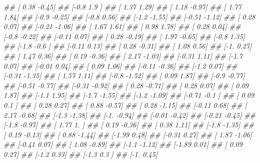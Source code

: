 \documentclass[
]{book}
\newenvironment{Shaded}{\begin{snugshade}}{\end{snugshade}}
\newcommand{\CommentTok}[1]{\textcolor[rgb]{0.56,0.35,0.01}{\textit{#1}}}
\theoremstyle{definition}
\theoremstyle{definition}
\theoremstyle{definition}
\theoremstyle{definition}
\theoremstyle{remark}
\begin{document}
\begin{Shaded}
\begin{Highlighting}[]
\CommentTok{\#\#  [ 0.38 {-}0.45]}
\CommentTok{\#\#  [{-}0.8   1.9 ]}
\CommentTok{\#\#  [ 1.37  1.29]}
\CommentTok{\#\#  [ 1.18 {-}0.97]}
\CommentTok{\#\#  [ 1.77  1.84]}
\CommentTok{\#\#  [{-}0.9  {-}0.25]}
\CommentTok{\#\#  [{-}0.8   0.56]}
\CommentTok{\#\#  [{-}1.2  {-}1.55]}
\CommentTok{\#\#  [{-}0.51 {-}1.12]}
\CommentTok{\#\#  [ 0.28  0.07]}
\CommentTok{\#\#  [{-}0.21 {-}1.06]}
\CommentTok{\#\#  [ 1.67  1.61]}
\CommentTok{\#\#  [ 0.98  1.78]}
\CommentTok{\#\#  [ 0.28  0.04]}
\CommentTok{\#\#  [{-}0.8  {-}0.22]}
\CommentTok{\#\#  [{-}0.11  0.07]}
\CommentTok{\#\#  [ 0.28 {-}0.19]}
\CommentTok{\#\#  [ 1.97 {-}0.65]}
\CommentTok{\#\#  [{-}0.8   1.35]}
\CommentTok{\#\#  [{-}1.8  {-}0.6 ]}
\CommentTok{\#\#  [{-}0.11  0.13]}
\CommentTok{\#\#  [ 0.28 {-}0.31]}
\CommentTok{\#\#  [ 1.08  0.56]}
\CommentTok{\#\#  [{-}1.    0.27]}
\CommentTok{\#\#  [ 1.47  0.36]}
\CommentTok{\#\#  [ 0.19 {-}0.36]}
\CommentTok{\#\#  [ 2.17 {-}1.03]}
\CommentTok{\#\#  [{-}0.31  1.11]}
\CommentTok{\#\#  [{-}1.7   0.07]}
\CommentTok{\#\#  [{-}0.01  0.04]}
\CommentTok{\#\#  [ 0.09  1.06]}
\CommentTok{\#\#  [{-}0.11 {-}0.36]}
\CommentTok{\#\#  [{-}1.2   0.07]}
\CommentTok{\#\#  [{-}0.31 {-}1.35]}
\CommentTok{\#\#  [ 1.57  1.11]}
\CommentTok{\#\#  [{-}0.8  {-}1.52]}
\CommentTok{\#\#  [ 0.09  1.87]}
\CommentTok{\#\#  [{-}0.9  {-}0.77]}
\CommentTok{\#\#  [{-}0.51 {-}0.77]}
\CommentTok{\#\#  [{-}0.31 {-}0.92]}
\CommentTok{\#\#  [ 0.28 {-}0.71]}
\CommentTok{\#\#  [ 0.28  0.07]}
\CommentTok{\#\#  [ 0.09  1.87]}
\CommentTok{\#\#  [{-}1.1   1.95]}
\CommentTok{\#\#  [{-}1.7  {-}1.55]}
\CommentTok{\#\#  [{-}1.2  {-}1.09]}
\CommentTok{\#\#  [{-}0.71 {-}0.1 ]}
\CommentTok{\#\#  [ 0.09  0.1 ]}
\CommentTok{\#\#  [ 0.28  0.27]}
\CommentTok{\#\#  [ 0.88 {-}0.57]}
\CommentTok{\#\#  [ 0.28 {-}1.15]}
\CommentTok{\#\#  [{-}0.11  0.68]}
\CommentTok{\#\#  [ 2.17 {-}0.68]}
\CommentTok{\#\#  [{-}1.3  {-}1.38]}
\CommentTok{\#\#  [{-}1.   {-}0.94]}
\CommentTok{\#\#  [{-}0.01 {-}0.42]}
\CommentTok{\#\#  [{-}0.21 {-}0.45]}
\CommentTok{\#\#  [{-}1.8  {-}0.97]}
\CommentTok{\#\#  [ 1.77  1.  ]}
\CommentTok{\#\#  [ 0.19 {-}0.36]}
\CommentTok{\#\#  [ 0.38  1.11]}
\CommentTok{\#\#  [{-}1.8  {-}1.35]}
\CommentTok{\#\#  [ 0.19 {-}0.13]}
\CommentTok{\#\#  [ 0.88 {-}1.44]}
\CommentTok{\#\#  [{-}1.99  0.48]}
\CommentTok{\#\#  [{-}0.31  0.27]}
\CommentTok{\#\#  [ 1.87 {-}1.06]}
\CommentTok{\#\#  [{-}0.41  0.07]}
\CommentTok{\#\#  [ 1.08 {-}0.89]}
\CommentTok{\#\#  [{-}1.1  {-}1.12]}
\CommentTok{\#\#  [{-}1.89  0.01]}
\CommentTok{\#\#  [ 0.09  0.27]}
\CommentTok{\#\#  [{-}1.2   0.33]}
\CommentTok{\#\#  [{-}1.3   0.3 ]}
\CommentTok{\#\#  [{-}1.    0.45]}

\end{Highlighting}
\end{Shaded}
\end{document}
